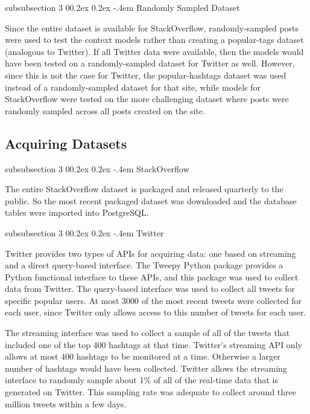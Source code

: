 \documentclass[man,floatsintext,donotrepeattitle]{apa6}
\makeatletter
\renewcommand{\subsubsection}{%
  \@startsection
  {subsubsection}%
  {3}%
  {\parindent}%
  {0\baselineskip \@plus 0.2ex \@minus 0.2ex}%
  {-.4em}%
  {\normalfont\normalsize\bfseries\addperi}}
\makeatother
\begin{document}
\subsubsection{Randomly Sampled Dataset}

Since the entire dataset is available for StackOverflow, randomly-sampled posts were used to test the context models rather than creating a popular-tags dataset (analogous to Twitter).
If all Twitter data were available, then the models would have been tested on a randomly-sampled dataset for Twitter as well.
However, since this is not the case for Twitter, the popular-hashtags dataset was used instead of a randomly-sampled dataset for that site,
while models for StackOverflow were tested on the more challenging dataset where posts were randomly sampled across all posts created on the site.

\subsection{Acquiring Datasets}

\subsubsection{StackOverflow}

The entire StackOverflow dataset is packaged and released quarterly to the public.
So the most recent packaged dataset was downloaded and the database tables were imported into PostgreSQL.

\subsubsection{Twitter}

Twitter provides two types of APIs for acquiring data: one based on streaming and a direct query-based interface.
The Tweepy Python package provides a Python functional interface to these APIs, and this package was used to collect data from Twitter.
The query-based interface was used to collect all tweets for specific popular users.
At most \num{3000} of the most recent tweets were collected for each user, since Twitter only allows access to this number of tweets for each user.

The streaming interface was used to collect a sample of all of the tweets that included one of the top 400 hashtags at that time.
Twitter's streaming API only allows at most 400 hashtags to be monitored at a time.
Otherwise a larger number of hashtags would have been collected.
Twitter allows the streaming interface to randomly sample about 1\% of all of the real-time data that is generated on Twitter.
This sampling rate was adequate to collect around three million tweets within a few days.
\end{document}
